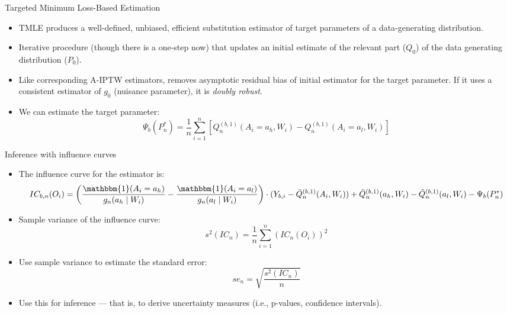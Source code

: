\documentclass[12pt,t,handout]{beamer}
\begin{document}
\begin{frame}[c]{Targeted Minimum Loss-Based Estimation}

\begin{center}
\begin{itemize}
  \itemsep12pt
  \item TMLE produces a well-defined, unbiased, efficient substitution estimator
    of target parameters of a data-generating distribution.
  \item Iterative procedure (though there is a one-step now) that updates an
    initial estimate of the relevant part ($Q_0$) of the data generating
    distribution ($P_0$).
  \item Like corresponding A-IPTW estimators, removes asymptotic residual bias
    of initial estimator for the target parameter. If it uses a consistent
    estimator of $g_0$ (nuisance parameter), it is \textit{doubly robust}.
  \item We can estimate the target parameter:
    \[
      \Psi_b(P_n^*) = \frac{1}{n}\sum_{i=1}^{n}[Q_n^{(b,1)}(A_i = a_h, W_i) -
      Q_n^{(b,1)}(A_i = a_l, W_i)]
    \]
\end{itemize}
\end{center}

\end{frame}




\begin{frame}[c]{Inference with influence curves}

\begin{center}
\begin{itemize}
  \itemsep12pt
  \item The influence curve for the estimator is:
  \begin{dmath}
    IC_{b,n}(O_i) = \left (\frac{\mathbbm{1}(A_i = a_{h})}{g_n(a_{h} \mid W_i)}
    - \frac{\mathbbm{1}(A_i = a_{l})}{g_n (a_{l} \mid W_i)} \right) \cdot
    (Y_{b,i} - \bar{Q}^{(b,1)}_n(A_i, W_i)) +
    \bar{Q}^{(b,1)}_n(a_{h}, W_i) - \bar{Q}^{(b,1)}_n(a_{l}, W_i) -
    \Psi_{b}(P_n^*)
  \end{dmath}
  \item Sample variance of the influence curve:
    \[
      \textstyle s^2(IC_n) = \frac{1}{n}\sum_{i=1}^n\left(IC_n(O_i) \right)^2
    \]
  \item Use sample variance to estimate the standard error:
    \[
      se_n = \sqrt{\frac{s^2(IC_n)}{n}}
    \]
  \item Use this for inference --- that is, to derive uncertainty measures
    (i.e., p-values, confidence intervals).
\end{itemize}
\end{center}

\end{frame}
\end{document}
